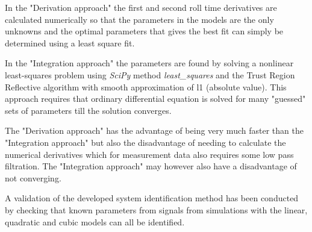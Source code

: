 In the "Derivation approach" the first and second roll time derivatives are calculated numerically so that the parameters in the models are the only unknowns and the optimal parameters that gives the best fit can simply be determined using a least square fit.

In the "Integration approach" the parameters are found by solving a nonlinear least-squares problem using \emph{SciPy} method \emph{least\_squares} \cite{noauthor_scipyoptimizeleast_squares_nodate} and the Trust Region Reflective algorithm with smooth approximation of l1 (absolute value). This approach requires that ordinary differential equation is solved for many "guessed" sets of parameters till the solution converges.

The "Derivation approach" has the advantage of being very much faster than the "Integration approach" but also the disadvantage of needing to calculate the numerical derivatives which for measurement data also requires some low pass filtration. The "Integration approach" may however also have a disadvantage of not converging.

A validation of the developed system identification method has been conducted by checking that known parameters from signals from simulations with the linear, quadratic and cubic models can all be identified. 
